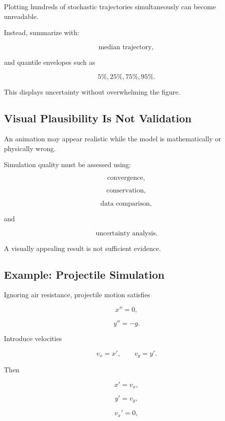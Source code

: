Plotting hundreds of stochastic trajectories simultaneously can become
unreadable.

Instead, summarize with:

\[
\boxed{
\text{median trajectory},
}
\]

and quantile envelopes such as

\[
\boxed{
5\%,
25\%,
75\%,
95\%.
}
\]

This displays uncertainty without overwhelming the figure.

\subsection{Visual Plausibility Is Not Validation}
\label{subsec:simulation-visual-plausibility}

An animation may appear realistic while the model is mathematically or
physically wrong.

Simulation quality must be assessed using:

\[
\boxed{
\text{convergence},
}
\]

\[
\boxed{
\text{conservation},
}
\]

\[
\boxed{
\text{data comparison},
}
\]

and

\[
\boxed{
\text{uncertainty analysis}.
}
\]

A visually appealing result is not sufficient evidence.

\subsection{Example: Projectile Simulation}
\label{subsec:projectile-simulation}

Ignoring air resistance, projectile motion satisfies

\[
\boxed{
x''=0,
}
\]

\[
\boxed{
y''=-g.
}
\]

Introduce velocities

\[
v_x=x',
\qquad
v_y=y'.
\]

Then

\[
\boxed{
x'=v_x,
}
\]

\[
\boxed{
y'=v_y,
}
\]

\[
\boxed{
v_x'=0,
}
\]

